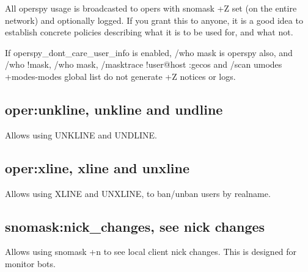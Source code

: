 	All operspy usage is broadcasted to opers with snomask +Z set (on the
	entire network) and optionally logged. If you grant this to anyone, it
	is a good idea to establish concrete policies describing what it is to
	be used for, and what not.

	If operspy\_dont\_care\_user\_info is enabled, /who mask is operspy
	also, and /who !mask, /who mask, /masktrace !user@host :gecos and
	/scan umodes +modes-{}modes global list do not generate +Z notices or
	logs.


\subsection{oper:unkline, unkline and undline}

	Allows using UNKLINE and UNDLINE.


\subsection{oper:xline, xline and unxline}

	Allows using XLINE and UNXLINE, to ban/unban users by realname.


\subsection{snomask:nick\_changes, see nick changes}

	Allows using snomask +n to see local client nick changes. This is
	designed for monitor bots.
